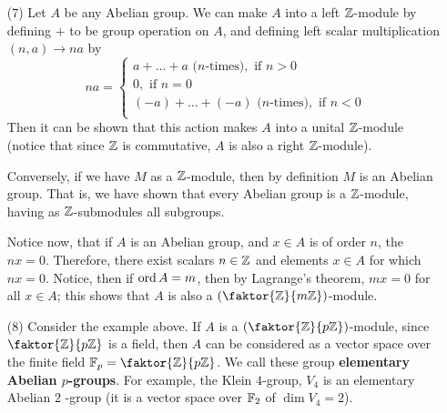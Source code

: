 \begin{example}
\begin{enumerate}
         \item[(7)] Let $A$ be any Abelian group. We can make $A$ into a left
             $\mathbb{Z}$-module by defining $+$ to be group operation on $A$, and
             defining left scalar multiplication $(n,a) \xrightarrow{} na$ by
             \begin{equation*}
                 na=\begin{cases}
                     a+\dots+a \text{ ($n$-times)}, \text{ if } n>0  \\
                     0, \text{ if } n=0 \\
                     (-a)+\dots+(-a) \text{ ($n$-times)}, \text{ if } n<0  \\
                    \end{cases}
             \end{equation*}
             Then it can be shown that this action makes $A$ into a unital
             $\mathbb{Z}$-module (notice that since $\mathbb{Z}$ is commutative, $A$ is also a
             right $\mathbb{Z}$-module).

             Conversely, if we have $M$ as a  $\mathbb{Z}$-module, then by definition
             $M$ is an Abelian group. That is, we have shown that every Abelian
             group is a $\mathbb{Z}$-module, having as  $\mathbb{Z}$-submodules all subgroups.

             Notice now, that if  $A$ is an Abelian group, and  $x \in A$ is of
             order  $n$, the $nx=0$. Therefore, there exist scalars  $n \in \mathbb{Z}$
             and elements  $x \in A$ for which  $nx=0$. Notice, then if
             $\operatorname{ord}{A}=m$, then by Lagrange's theorem, $mx=0$ for all  $x \in A$;
             this shows that  $A$ is also a $(\faktor{\Z}{m\Z})$-module.

         \item[(8)] Consider the example above. If $A$ is a
             $(\faktor{\Z}{p\Z})$-module, since $\faktor{\Z}{p\Z}$ is a field,
             then $A$ can be considered as a vector space over the finite field
              $\F_p=\faktor{\Z}{p\Z}$. We call these group  \textbf{elementary
                  Abelian $p$-groups}. For example, the Klein $4$-group, $V_4$
                  is an elementary Abelian $2$ -group (it is a vector space over
                  $\mathbb{F}_2$ of $\dim{V_4}=2$).
    \end{enumerate}
\end{example}

